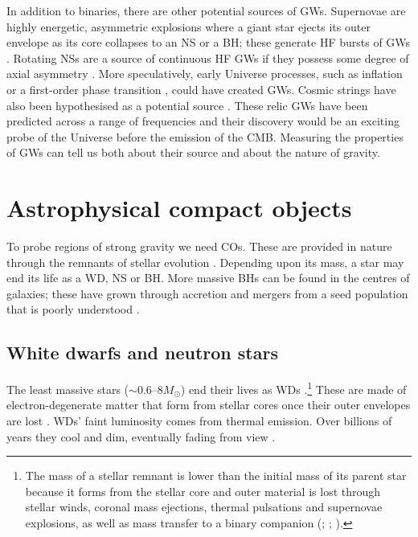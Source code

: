 In addition to binaries, there are other potential sources of GWs. Supernovae are highly energetic, asymmetric explosions where a giant star ejects its outer envelope as its core collapses to an NS or a BH; these generate HF bursts of GWs \citep{Dimmelmeier2002,Kotake2006}. Rotating NSs are a source of continuous HF GWs if they possess some degree of axial asymmetry \citep{Abbott2007,Prix2009}. More speculatively, early Universe processes, such as inflation \citep{Grishchuk2005} or a first-order phase transition \citep{Binetruy2012}, could have created GWs. Cosmic strings have also been hypothesised as a potential source \citep{Damour2005,Binetruy2012}. These relic GWs have been predicted across a range of frequencies and their discovery would be an exciting probe of the Universe before the emission of the CMB. Measuring the properties of GWs can tell us both about their source and about the nature of gravity.

\section{Astrophysical compact objects}\label{sec:COs}

To probe regions of strong gravity we need COs. These are provided in nature through the remnants of stellar evolution \citep[section 1.1]{Shapiro1983}. Depending upon its mass, a star may end its life as a WD, NS or BH. More massive BHs can be found in the centres of galaxies; these have grown through accretion and mergers from a seed population that is poorly understood \citep{Volonteri2010}.

\subsection{White dwarfs and neutron stars}

The least massive stars ($\sim0.6$--$8M_\odot$) end their lives as WDs \citep{Poelarends2008}.\footnote{The mass of a stellar remnant is lower than the initial mass of its parent star because it forms from the stellar core and outer material is lost through stellar winds, coronal mass ejections, thermal pulsations and supernovae explosions, as well as mass transfer to a binary companion (\citealt{Woosley2002}; \citealt[section 0.7]{Weiss2004}; \citealt{Puls2008}).} These are made of electron-degenerate matter that form from stellar cores once their outer envelopes are lost \citep{Althaus2010}. WDs' faint luminosity comes from thermal emission. Over billions of years they cool and dim, eventually fading from view \citep[section 4.2]{Shapiro1983}.

